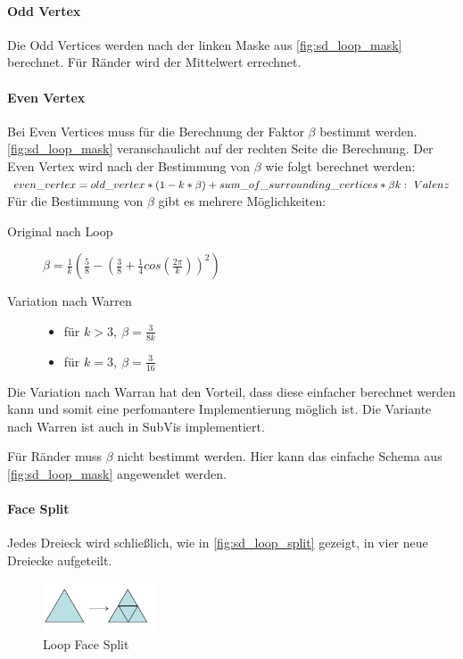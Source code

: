 \paragraph*{Odd Vertex}
Die Odd Vertices werden nach der linken Maske aus \autoref{fig:sd_loop_mask} berechnet.
Für Ränder wird der Mittelwert errechnet.

\paragraph*{Even Vertex}

Bei Even Vertices muss für die Berechnung der Faktor \(\beta\) bestimmt werden.
\autoref{fig:sd_loop_mask} veranschaulicht auf der rechten Seite die Berechnung.
Der Even Vertex wird nach der Bestimmung von \(\beta\) wie folgt berechnet werden:\\
\(
even\_vertex = old\_vertex * (1 - k * \beta) + sum\_of\_surrounding\_vertices * \beta\\
k:\ Valenz
\)
\\
Für die Bestimmung von \(\beta\) gibt es mehrere Möglichkeiten:
\begin{description}
\item[Original nach Loop]  \(\beta=\frac{1}{k}(\frac{5}{8}-(\frac{3}{8}+\frac{1}{4}cos(\frac{2\pi}{k}))^2)\)
\item[Variation nach Warren] \mbox{}
	\begin{itemize}
		\item für \(k > 3,\ \beta = \frac{3}{8k}\)
		\item für \(k = 3,\ \beta = \frac{3}{16}\)	
	\end{itemize}
\end{description}
Die Variation nach Warran hat den Vorteil, dass diese einfacher berechnet werden kann
und somit eine perfomantere Implementierung möglich ist.
Die Variante nach Warren ist auch in SubVis implementiert.

Für Ränder muss \(\beta\) nicht bestimmt werden.
Hier kann das einfache Schema aus \autoref{fig:sd_loop_mask} angewendet werden.
\cite{Carnegie}
\cite{Standford.Loop}
\cite[S. 70 f.]{Zorin.subdivcourse}

\paragraph*{Face Split}

Jedes Dreieck wird schließlich, wie in \autoref{fig:sd_loop_split} gezeigt, in vier neue Dreiecke aufgeteilt.

\begin{figure}
\centering
\includegraphics[width=0.3\textwidth]{content/media/sd_loop_split.png}
\caption{Loop Face Split \cite[S. 56 f.]{Standford.24.07.2015}}
\label{fig:sd_loop_split}
\end{figure}

